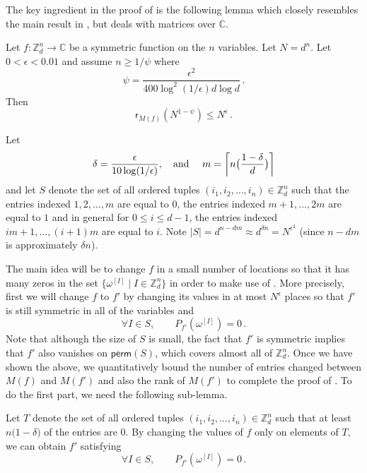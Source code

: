 \documentclass{toc}
\renewcommand\Z{{\mathbb{Z}}}
\renewcommand\C{{\mathbb{C}}}
\newcommand\perm{\textsf{perm}}
\begin{document}
The key ingredient in the proof of  is the following lemma which closely resembles the main result in \cite{CLP}, but deals with matrices over $\C$.
\begin{lemma}\label{non-rigidity1}
Let $f: \Z_d^n \rightarrow \C$ be a symmetric function on the $n$ variables.  Let $N = d^n$.  Let $0 < \epsilon < 0.01 $ and assume $n \geq 1/\psi$ where \[\psi = \frac{\epsilon^2 }{400\log^2 (1/\epsilon) d \log d} \,. \]  Then 
\[
\textsf{r}_{M(f)}\left(N^{1 - \psi}\right) \leq N^{ \epsilon} \,.
\]

\end{lemma}
%
%
Let %
\[
\delta = \frac{\epsilon}{10\log (1/\epsilon)},
   \text{\quad and \quad}
m = \left\lceil n\big( \frac{1 - \delta}{d} \big) \right\rceil
\]
and let $S$ denote the set of all ordered tuples $(i_1, i_2, \dots ,i_n) \in \Z_d^n$ such that the entries indexed
$1,2, \dots ,m$   %
are equal to $0$, the entries indexed $m+1, \dots ,2m$ are equal to $1$ and in general for $0 \leq i \leq d-1$, the entries indexed $im + 1, \dots , (i+1)m$ are equal to $i$.  Note $|S| = d^{n-dm} \approx d^{\delta n} = N^{\epsilon^2}$ (since $n - dm$ is approximately $\delta n$).  

The main idea will be to change $f$ in a small number of locations so that it has many zeros in the set %
$\{\omega^{[I]} \mid I \in \Z_d^n \}$ %
in order to make use of .  More precisely, first we will change $f$ to $f'$ by changing its values in at most $N^{\epsilon}$ places so that $f'$ is still symmetric in all of the variables and
%
%
\begin{equation*} \forall I\in S,\qquad P_{f'}\left( \omega^{[I]} \right) = 0 \,.
\end{equation*}   %
Note that although the size of $S$ is small, the fact that $f'$ is symmetric implies that $f'$ also vanishes on $\perm(S)$, which covers almost all of $\Z_d^n$.  Once we have shown the above, we quantitatively bound the number of entries changed between $M(f)$ and $M(f')$ and also the rank of $M(f')$ to complete the proof of .  To do the first part, we need the following sub-lemma.
\begin{lemma}\label{changes}
Let $T$ denote the set of all ordered tuples $(i_1, i_2, \dots ,i_n) \in \Z_d^n$  such that at least $n\big(1 - \delta \big)$ of the entries are $0$. By changing the values of $f$ only on elements of $T$, we can obtain $f'$ satisfying 
%
\begin{equation}\label{roots} \forall I\in S, \qquad
P_{f'}\left( \omega^{[I]} \right) = 0 \,.
\end{equation}
\end{lemma}
\end{document}
